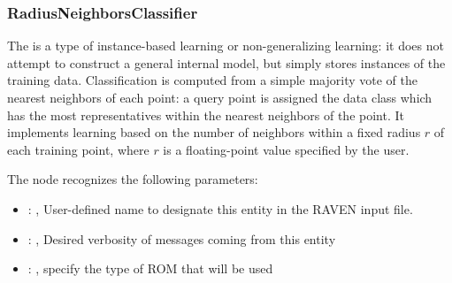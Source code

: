 \subsubsection{RadiusNeighborsClassifier}
  The  is a type of instance-based learning or
  non-generalizing learning: it does not attempt to construct a general internal
  model, but simply stores instances of the training data.                          Classification
  is computed from a simple majority vote of the nearest neighbors                          of each
  point: a query point is assigned the data class which has the most
  representatives within the nearest neighbors of the point.                          It implements
  learning based on the number of neighbors within a fixed radius                          $r$ of
  each training point, where $r$ is a floating-point value specified by the
  user.                          

  The  node recognizes the following parameters:
    \begin{itemize}
      \item {}: ,
        User-defined name to designate this entity in the RAVEN input file.
      \item {}: ,
        Desired verbosity of messages coming from this entity
      \item {}: ,
        specify the type of ROM that will be used
  \end{itemize}

